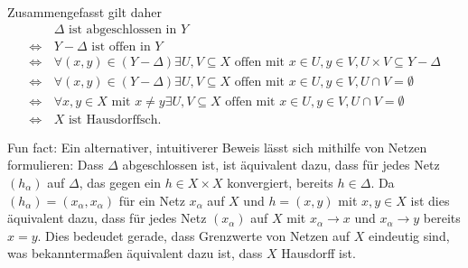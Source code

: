 \documentclass[a4paper,10pt]{article}
\begin{document}
Zusammengefasst gilt daher
\begin{align*}
                &\, \Delta \text{ ist abgeschlossen in } Y \\
 \Leftrightarrow&\, Y-\Delta \text{ ist offen in } Y \\
 \Leftrightarrow&\, \forall (x,y) \in (Y-\Delta) \exists U,V \subseteq X \text{ offen mit } x \in U, y \in V, U \times V \subseteq Y-\Delta \\
 \Leftrightarrow&\, \forall (x,y) \in (Y-\Delta) \exists U,V \subseteq X \text{ offen mit } x \in U, y \in V, U \cap V = \emptyset \\
 \Leftrightarrow&\, \forall x,y \in X \text{ mit } x \neq y \exists U,V \subseteq X \text{ offen mit } x \in U, y \in V, U \cap V = \emptyset \\
 \Leftrightarrow&\, X \text{ ist Hausdorffsch.}
\end{align*}

Fun fact: Ein alternativer, intuitiverer Beweis lässt sich mithilfe von Netzen formulieren: Dass $\Delta$ abgeschlossen ist, ist äquivalent dazu, dass für jedes Netz $(h_\alpha)$ auf $\Delta$, das gegen ein $h \in X \times X$ konvergiert, bereits $h \in \Delta$. Da $(h_\alpha) = (x_\alpha, x_\alpha)$ für ein Netz $x_\alpha$ auf $X$ und $h = (x,y)$ mit $x,y \in X$ ist dies äquivalent dazu, dass für jedes Netz $(x_\alpha)$ auf $X$ mit $x_\alpha \to x$ und $x_\alpha \to y$ bereits $x = y$. Dies bedeudet gerade, dass Grenzwerte von Netzen auf $X$ eindeutig sind, was bekanntermaßen äquivalent dazu ist, dass $X$ Hausdorff ist.
\end{document}

